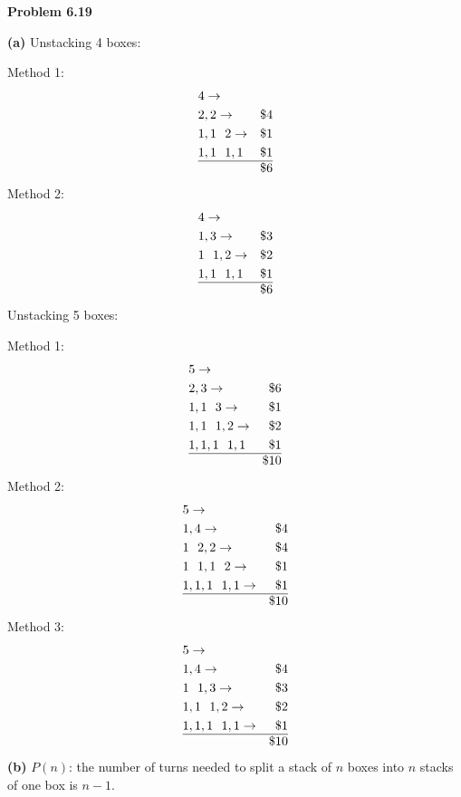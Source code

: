 \documentclass[fleqn]{article}
\begin{document}
\newpage
{\Large\bf Problem 6.19}\vspace{1em}\par
\textbf{(a)} Unstacking 4 boxes:\par
Method 1:
\begin{align*}
	&4 \rightarrow &\\
	&2,2 \rightarrow &\$4\\
	&1,1\ \ 2 \rightarrow &\$1\\
	&1,1\ \ 1,1 &\$1\\
	\hline
	& &\$6
\end{align*}
Method 2:
\begin{align*}
	&4 \rightarrow &\\
	&1,3 \rightarrow &\$3\\
	&1\ \ 1,2 \rightarrow &\$2\\
	&1,1\ \ 1,1 &\$1\\
	\hline
	& &\$6
\end{align*}
Unstacking 5 boxes:\par
Method 1:
\begin{align*}
	&5 \rightarrow &\\
	&2,3 \rightarrow &\$6\\
	&1,1\ \ 3 \rightarrow &\$1\\
	&1,1\ \ 1,2 \rightarrow &\$2\\
	&1,1,1\ \ 1,1 &\$1\\
	\hline
	& &\$10
\end{align*}
Method 2:
\begin{align*}
	&5 \rightarrow &\\
	&1,4 \rightarrow &\$4\\
	&1\ \ 2,2 \rightarrow &\$4\\
	&1\ \ 1,1\ \ 2 \rightarrow &\$1\\
	&1,1,1\ \ 1,1 \rightarrow &\$1\\
	\hline
	& &\$10
\end{align*}
Method 3:
\begin{align*}
	&5 \rightarrow &\\
	&1,4 \rightarrow &\$4\\
	&1\ \ 1,3 \rightarrow &\$3\\
	&1,1\ \ 1,2 \rightarrow &\$2\\
	&1,1,1\ \ 1,1 \rightarrow &\$1\\
	\hline
	& &\$10
\end{align*}
\newpage
\textbf{(b)} $P(n)$: the number of turns needed to split a stack of $n$ boxes into $n$ stacks of one box is $n-1$.\par
\end{document}
